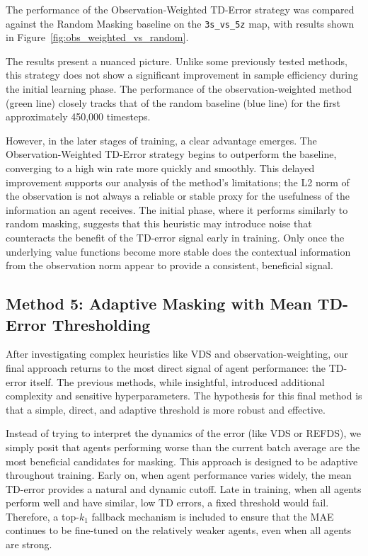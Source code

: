 The performance of the Observation-Weighted TD-Error strategy was compared against the Random Masking baseline on the \texttt{3s\_vs\_5z} map, with results shown in Figure~\ref{fig:obs_weighted_vs_random}.

The results present a nuanced picture. Unlike some previously tested methods, this strategy does not show a significant improvement in sample efficiency during the initial learning phase. The performance of the observation-weighted method (green line) closely tracks that of the random baseline (blue line) for the first approximately 450,000 timesteps.

However, in the later stages of training, a clear advantage emerges. The Observation-Weighted TD-Error strategy begins to outperform the baseline, converging to a high win rate more quickly and smoothly. This delayed improvement supports our analysis of the method's limitations; the L2 norm of the observation is not always a reliable or stable proxy for the usefulness of the information an agent receives. The initial phase, where it performs similarly to random masking, suggests that this heuristic may introduce noise that counteracts the benefit of the TD-error signal early in training. Only once the underlying value functions become more stable does the contextual information from the observation norm appear to provide a consistent, beneficial signal.

\subsection{Method 5: Adaptive Masking with Mean TD-Error Thresholding}

After investigating complex heuristics like VDS and observation-weighting, our final approach returns to the most direct signal of agent performance: the TD-error itself. The previous methods, while insightful, introduced additional complexity and sensitive hyperparameters. The hypothesis for this final method is that a simple, direct, and adaptive threshold is more robust and effective.

Instead of trying to interpret the dynamics of the error (like VDS or REFDS), we simply posit that agents performing worse than the current batch average are the most beneficial candidates for masking. This approach is designed to be adaptive throughout training. Early on, when agent performance varies widely, the mean TD-error provides a natural and dynamic cutoff. Late in training, when all agents perform well and have similar, low TD errors, a fixed threshold would fail. Therefore, a top-$k_1$ fallback mechanism is included to ensure that the MAE continues to be fine-tuned on the relatively weaker agents, even when all agents are strong.

